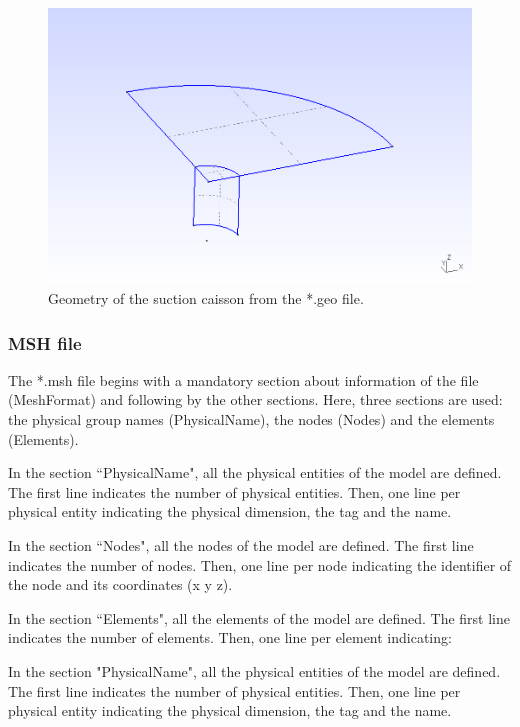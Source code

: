 \documentclass[a4]{article}
\begin{document}
\begin{figure}[tbh!]
	\centering
	\includegraphics[scale=0.6]{geometry_geo.png}
	\caption{Geometry of the suction caisson from the *.geo file.}
	\label{fig:geometry_geo}
\end{figure}

\subsubsection{MSH file}

The *.msh file begins with a mandatory section about information of the file (MeshFormat) and following by the other sections. Here, three sections are used: the physical group names (PhysicalName), the nodes (Nodes) and the elements (Elements).

In the section ``PhysicalName", all the physical entities of the model are defined. The first line indicates the number of physical entities. Then, one line per physical entity indicating the physical dimension, the tag and the name.  

In the section ``Nodes", all the nodes of the model are defined. The first line indicates the number of nodes. Then, one line per node indicating the identifier of the node and its coordinates (x y z).

In the section ``Elements", all the elements of the model are defined. The first line indicates the number of elements. Then, one line per element indicating:

In the section "PhysicalName", all the physical entities of the model are defined. The first line indicates the number of physical entities. Then, one line per physical entity indicating the physical dimension, the tag and the name.  
\end{document}
